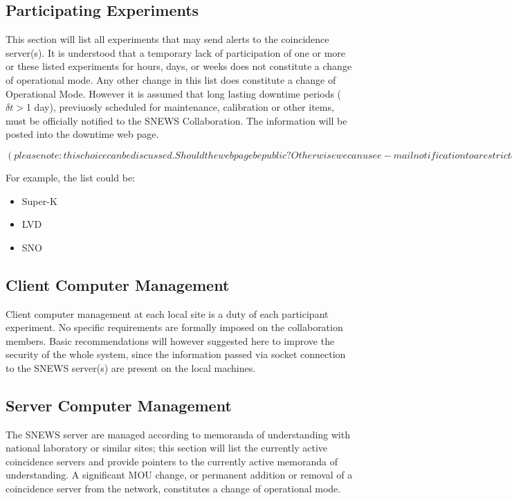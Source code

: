 \documentclass{article}
\begin{document}
\subsection{Participating Experiments}

This section will list all experiments that may send alerts to the
coincidence server(s).  It is understood that a temporary lack of
participation of one or more or these listed experiments for hours,
days, or weeks does not constitute a change of operational mode.  Any
other change in this list does constitute a change of Operational
Mode. However it is assumed that long lasting downtime periods
($\delta t>$1 day), previuosly scheduled for maintenance, calibration
or other items, must be officially notified to the SNEWS
Collaboration. The information will be posted into the downtime web
page.

$(please note: this choice can be discussed. Should the web page be public? 
Otherwise we can use e-mail notification to a restricted  subgroup inside the 
collaboration).$

 For example, the list could be:

\begin{itemize}
\item Super-K
\item LVD
\item SNO
\end{itemize}

\subsection{Client Computer Management}

Client computer management at each local site is a duty of each
participant experiment. No specific requirements are formally imposed
on the collaboration members. Basic recommendations will however
suggested here to improve the security of the whole system, since the
information passed via socket connection to the SNEWS server(s) are
present on the local machines.


\subsection{Server Computer Management}

The SNEWS server are managed according to memoranda
of understanding with national laboratory or similar sites;
this section will list the currently active coincidence
servers and provide pointers to the currently active memoranda
of understanding.  A significant MOU change, or permanent addition
or removal of a coincidence server from the network,  
constitutes a change of operational mode.
\end{document}
